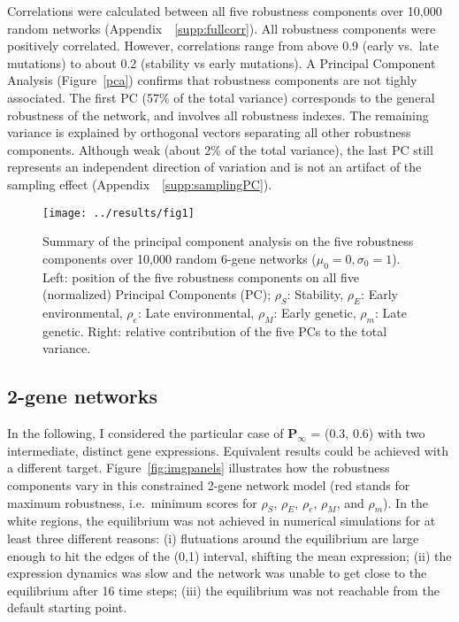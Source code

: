 \documentclass[10pt,a4paper]{article}
\newcommand{\stability}{{\rho_S}}
\newcommand{\earlyenv}{{\rho_E}}
\newcommand{\lateenv}{{\rho_e}}
\newcommand{\earlymut}{{\rho_M}}
\newcommand{\latemut}{{\rho_m}}
\newcommand{\SupMat}{Appendix~}
\begin{document}
Correlations were calculated between all five robustness components over 10,000 random networks (\SupMat~\ref{supp:fullcorr}). All robustness components were positively correlated. However, correlations range from above 0.9 (early vs.\ late mutations) to about 0.2 (stability vs early mutations). A Principal Component Analysis (Figure~\ref{pca}) confirms that robustness components are not tighly associated. The first PC (57\% of the total variance) corresponds to the general robustness of the network, and involves all robustness indexes. The remaining variance is explained by orthogonal vectors separating all other robustness components. Although weak (about 2\% of the total variance), the last PC still represents an independent direction of variation and is not an artifact of the sampling effect (\SupMat~\ref{supp:samplingPC}). 

\begin{figure}[t]
\begin{center}
\texttt{[image: ../results/fig1]}
\caption{\color{Gray} \label{fig:pca} Summary of the principal component analysis on the five robustness components over 10,000 random 6-gene networks ($\mu_0=0, \sigma_0=1$). Left: position of the five robustness components on all five (normalized) Principal Components (PC); $\stability$: Stability, $\earlyenv$: Early environmental, $\lateenv$: Late environmental, $\earlymut$: Early genetic, $\latemut$: Late genetic. Right: relative contribution of the five PCs to the total variance.}
\end{center}
\end{figure}

\subsection{2-gene networks}

In the following, I considered the particular case of $\bm P_\infty$ = (0.3, 0.6) with two intermediate, distinct gene expressions. Equivalent results could be achieved with a different target. Figure~\ref{fig:imgpanels} illustrates how the robustness components vary in this constrained 2-gene network model (red stands for maximum robustness, i.e.\ minimum scores for $\stability$, $\earlyenv$, $\lateenv$, $\earlymut$, and $\latemut$). In the white regions, the equilibrium was not achieved in numerical simulations for at least three different reasons: (i) flutuations around the equilibrium are large enough to hit the edges of the (0,1) interval, shifting the mean expression; (ii) the expression dynamics was slow and the network was unable to get close to the equilibrium after 16 time steps; (iii) the equilibrium was not reachable from the default starting point.
\end{document}
